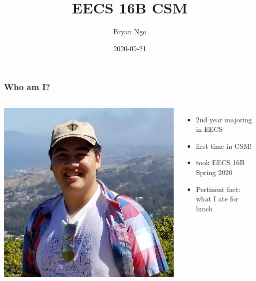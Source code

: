 \documentclass[aspectratio=169]{beamer}
\title{EECS 16B CSM}
\author{Bryan Ngo}
\date{2020-09-21}
\institute{Computer Science Mentors}
\begin{document}
\begin{frame}
    \maketitle
\end{frame}

\begin{frame}
    \tableofcontents
\end{frame}

\begin{frame}
    \frametitle{Who am I?}

    \begin{columns}
        \includegraphics[width=0.8\textheight]{bryan_ngo.png}

        \begin{itemize}
            \item 2nd year majoring in EECS
            \item first time in CSM!
            \item took EECS 16B Spring 2020
            \item Pertinent fact: what I ate for lunch
        \end{itemize}
    \end{columns}
\end{frame}
\end{document}
